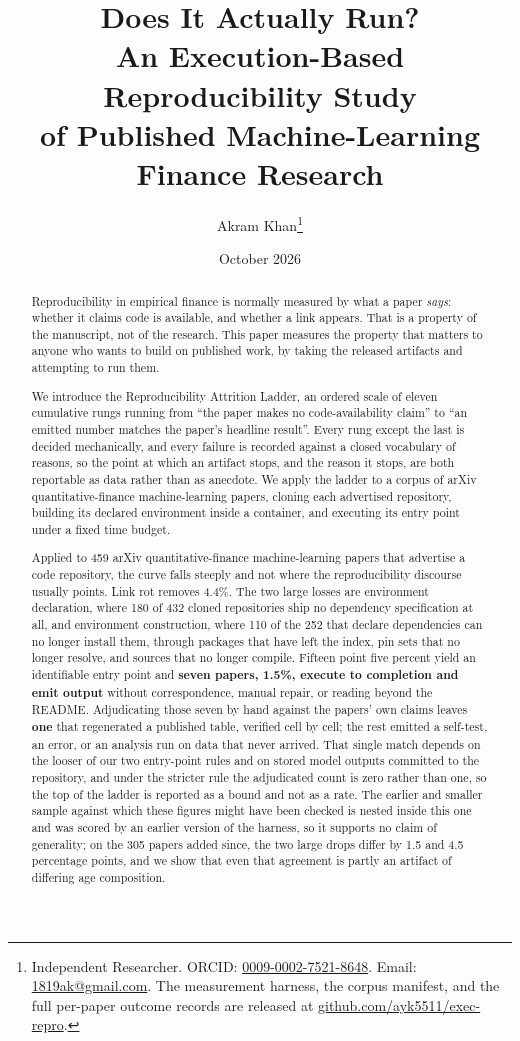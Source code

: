 \documentclass[12pt,a4paper]{article}
\title{Does It Actually Run?\\
An Execution-Based Reproducibility Study\\
of Published Machine-Learning Finance Research}
\author{
    Akram Khan\thanks{Independent Researcher. ORCID: \href{https://orcid.org/0009-0002-7521-8648}{0009-0002-7521-8648}. Email: \href{mailto:1819ak@gmail.com}{1819ak@gmail.com}. The measurement harness, the corpus manifest, and the full per-paper outcome records are released at \href{https://github.com/ayk5511/exec-repro}{github.com/ayk5511/exec-repro}.}
}
\date{October 2026}
\begin{document}
\maketitle

\begin{abstract}
Reproducibility in empirical finance is normally measured by what a paper
\emph{says}: whether it claims code is available, and whether a link appears.
That is a property of the manuscript, not of the research. This paper measures
the property that matters to anyone who wants to build on published work,
by taking the released artifacts and attempting to run them.

We introduce the Reproducibility Attrition Ladder, an ordered scale of eleven
cumulative rungs running from ``the paper makes no code-availability claim'' to
``an emitted number matches the paper's headline result''. Every rung except the
last is decided mechanically, and every failure is recorded against a closed
vocabulary of reasons, so the point at which an artifact stops, and the reason it
stops, are both reportable as data rather than as anecdote. We apply the ladder
to a corpus of arXiv quantitative-finance machine-learning papers, cloning each
advertised repository, building its declared environment inside a container, and
executing its entry point under a fixed time budget.

Applied to 459 arXiv quantitative-finance machine-learning papers that advertise
a code repository, the curve falls steeply and not where the reproducibility
discourse usually points. Link rot removes 4.4\%. The two large losses are
environment declaration, where 180 of 432 cloned repositories ship no dependency
specification at all, and environment construction, where 110 of the 252 that
declare dependencies can no longer install them, through packages that have left
the index, pin sets that no longer resolve, and sources that no longer compile.
Fifteen point five percent yield an identifiable entry point and
\textbf{seven papers, 1.5\%, execute to completion and emit output} without
correspondence, manual repair, or reading beyond the README. Adjudicating those
seven by hand against the papers' own claims leaves \textbf{one} that regenerated
a published table, verified cell by cell; the rest emitted a self-test, an error,
or an analysis run on data that never arrived. That single match depends on the
looser of our two entry-point rules and on stored model outputs committed to the
repository, and under the stricter rule the adjudicated count is zero rather than
one, so the top of the ladder is reported as a bound and not as a rate. The
earlier and smaller sample against which these figures might have been checked is
nested inside this one and was scored by an earlier version of the harness, so it
supports no claim of generality; on the 305 papers added since, the two large
drops differ by 1.5 and 4.5 percentage points, and we show that even that
agreement is partly an artifact of differing age composition.


\end{abstract}
\end{document}
